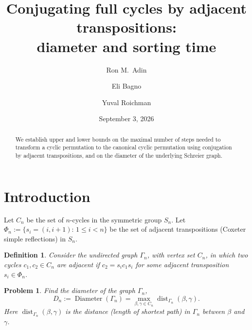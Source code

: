 \documentclass[11pt]{amsart}
\title[Conjugating full cycles]
{Conjugating full cycles by adjacent transpositions: \\
diameter and sorting time}
\author{Ron M.\ Adin}
\author{Eli Bagno}
\author{Yuval Roichman}
\date{September 3, 2026}
\newtheorem{problem}[theorem]{Problem}
\newtheorem{definition}[theorem]{Definition}
\numberwithin{equation}{section}
\newcommand{\todo}[1]{\vspace{5 mm}\par \noindent
\marginpar{\textsc{ToDo}} \framebox{\begin{minipage}[c]{0.95
\textwidth}
 #1 \end{minipage}}\vspace{5 mm}\par}
\newcommand{\dist}{{\operatorname{dist}}}
\newcommand{\D}{{\operatorname{Diameter}}}
\begin{document}
\begin{abstract}
    We establish upper and lower bounds on the maximal number of steps needed to transform a cyclic permutation to the canonical cyclic permutation  
    using conjugation by adjacent transpositions, and on the diameter of the underlying Schreier graph.  
\end{abstract}

\maketitle

\tableofcontents 


\section{Introduction}\label{sec:introduction}


Let $C_n$ be the set of $n$-cycles in the symmetric group $S_n$. 
Let $\Phi_n := \{s_i = (i,i+1) :\, 1 \le i < n\}$ be the set of adjacent transpositions (Coxeter simple reflections) in $S_n$.

\begin{definition}\label{def:1}
    Consider the undirected graph $\Gamma_n$, with vertex set $C_n$, in which two cycles $c_1,c_2 \in C_n$ are adjacent if $c_2 = s_i c_1 s_i$ for some adjacent transposition $s_i \in \Phi_n$.     
\end{definition}


\begin{problem}\label{pb:1}
    Find the diameter of the graph $\Gamma_n$,
    \[
        D_n := \D(\Gamma_n)
        = \max_{\beta,\gamma\in C_n} \dist_{\Gamma_n}(\beta,\gamma).
    \]
Here $ \dist_{\Gamma_n}(\beta,\gamma)$ is the 
distance (length of shortest path) in $\Gamma_n$ between $\beta$ and $\gamma$. 
\end{problem}



\end{document}
